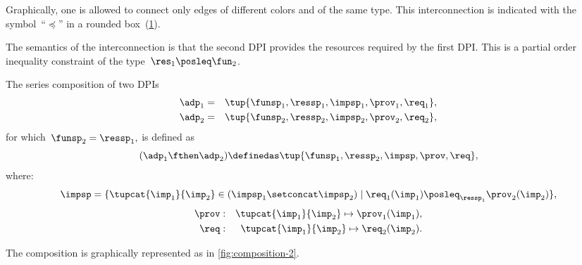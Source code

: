 Graphically, one is allowed to connect only edges of different colors and of the same type.
This interconnection is indicated with the symbol~``$\preceq$'' in a rounded box~(\cref{fig:connection}).

\begin{figure}[h]
  \centering
  \caption{\label{fig:connection}}
\end{figure}


The semantics of the interconnection is that the second DPI provides the resources required by the first DPI.
This is a partial order inequality constraint of the type~$\res_{1}\posleq\fun_{2}$.

\begin{definition}
  \label{def:series-composition}
  The series composition of two DPIs
  \begin{equation}
    \begin{aligned}
    \adp_{1}&=&\tup{\funsp_{1},\ressp_{1},\impsp_{1},\prov_{1},\req_{1}},
  \\
    \adp_{2}&=&\tup{\funsp_{2},\ressp_{2},\impsp_{2},\prov_{2},\req_{2}},
  \end{aligned}
  \end{equation}
  for which~$\funsp_{2}=\ressp_{1},$ is defined as
  \begin{equation}
    (\adp_{1} \fthen \adp_{2})
    \definedas
    \tup{ \funsp_{1},\ressp_{2},\impsp,\prov,\req},
  \end{equation}
  where:
  \begin{equation}
    \impsp  =  \{  \tupcat {\imp_{1}} {\imp_{2}} \in (\impsp_{1} \setconcat \impsp_{2})\mid\req_{1}(\imp_{1})\posleq_{\ressp_{1}}\prov_{2}(\imp_{2})\},
  \end{equation}
  \begin{equation}
  \begin{aligned}
    \prov & : & \tupcat {\imp_{1}} {\imp_{2}}   \mapsto\prov_{1}(\imp_{1}),\\
    \req & : & \tupcat {\imp_{1}} {\imp_{2}} \mapsto\req_{2}(\imp_{2}).
  \end{aligned}
  \end{equation}
\end{definition}

The composition is graphically represented as in \cref{fig:composition-2}.

